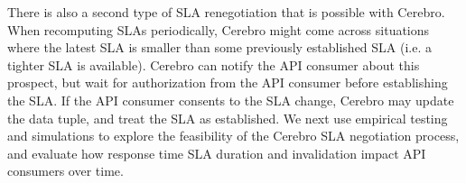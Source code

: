 There is also a second type of SLA renegotiation that is possible with Cerebro.
When recomputing SLAs periodically, Cerebro might come across situations where the latest SLA is smaller
than some previously established SLA (i.e. a tighter SLA is available). Cerebro can notify the 
API consumer about this prospect, but wait for authorization from the API consumer before 
establishing the SLA. If the API consumer consents to the SLA change, Cerebro may update the
data tuple, and treat the SLA as established.
We next use empirical testing and simulations to explore 
the feasibility of the Cerebro SLA negotiation process, and 
evaluate how response time SLA duration and invalidation impact API consumers over time.

